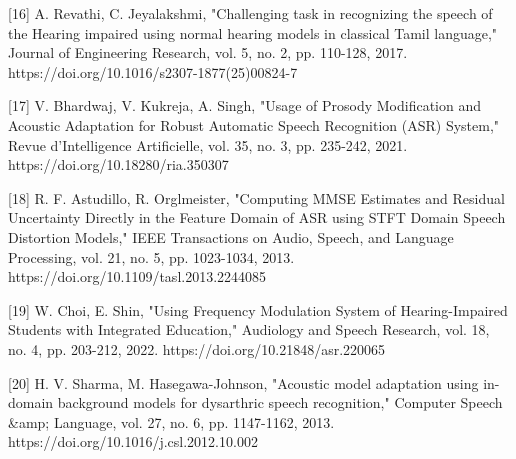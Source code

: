 \documentclass[12pt,a4paper]{article}
\begin{document}
[16] A. Revathi, C. Jeyalakshmi, "Challenging task in recognizing the speech of the Hearing impaired using normal hearing models in classical Tamil language," Journal of Engineering Research, vol. 5, no. 2, pp. 110-128, 2017. https://doi.org/10.1016/s2307-1877(25)00824-7


[17] V. Bhardwaj, V. Kukreja, A. Singh, "Usage of Prosody Modification and Acoustic Adaptation for Robust Automatic Speech Recognition (ASR) System," Revue d'Intelligence Artificielle, vol. 35, no. 3, pp. 235-242, 2021. https://doi.org/10.18280/ria.350307


[18] R. F. Astudillo, R. Orglmeister, "Computing MMSE Estimates and Residual Uncertainty Directly in the Feature Domain of ASR using STFT Domain Speech Distortion Models," IEEE Transactions on Audio, Speech, and Language Processing, vol. 21, no. 5, pp. 1023-1034, 2013. https://doi.org/10.1109/tasl.2013.2244085


[19] W. Choi, E. Shin, "Using Frequency Modulation System of Hearing-Impaired Students with Integrated Education," Audiology and Speech Research, vol. 18, no. 4, pp. 203-212, 2022. https://doi.org/10.21848/asr.220065


[20] H. V. Sharma, M. Hasegawa-Johnson, "Acoustic model adaptation using in-domain background models for dysarthric speech recognition," Computer Speech \&amp; Language, vol. 27, no. 6, pp. 1147-1162, 2013. https://doi.org/10.1016/j.csl.2012.10.002
\end{document}

